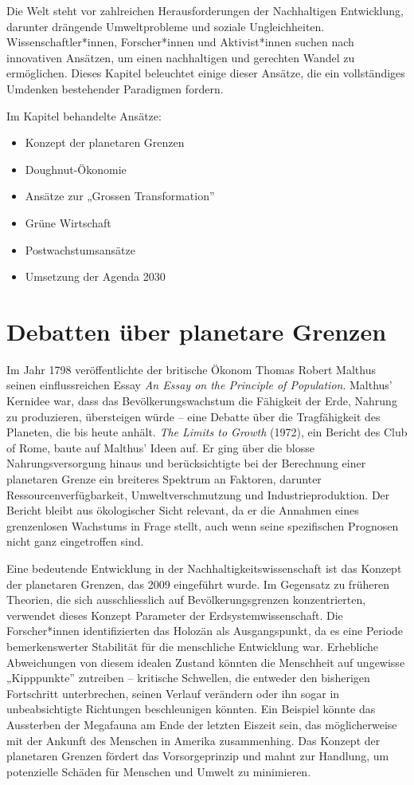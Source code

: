 \documentclass[
  nswissgerman,
  a4paper,
  DIV=11,
  numbers=noendperiod,
  oneside,
  openany]{scrreprt}
\begin{document}
Die Welt steht vor zahlreichen Herausforderungen der Nachhaltigen
Entwicklung, darunter drängende Umweltprobleme und soziale
Ungleichheiten. Wissenschaftler*innen, Forscher*innen und Aktivist*innen
suchen nach innovativen Ansätzen, um einen nachhaltigen und gerechten
Wandel zu ermöglichen. Dieses Kapitel beleuchtet einige dieser Ansätze,
die ein vollständiges Umdenken bestehender Paradigmen fordern.

Im Kapitel behandelte Ansätze:

\begin{itemize}
\item
  Konzept der planetaren Grenzen
\item
  Doughnut-Ökonomie
\item
  Ansätze zur „Grossen Transformation''
\item
  Grüne Wirtschaft
\item
  Postwachstumsansätze
\item
  Umsetzung der Agenda 2030
\end{itemize}

\section{Debatten über planetare
Grenzen}\label{debatten-uxfcber-planetare-grenzen}

Im Jahr 1798 veröffentlichte der britische Ökonom Thomas Robert Malthus
seinen einflussreichen Essay \emph{An Essay on the Principle of
Population}. Malthus' Kernidee war, dass das Bevölkerungswachstum die
Fähigkeit der Erde, Nahrung zu produzieren, übersteigen würde -- eine
Debatte über die Tragfähigkeit des Planeten, die bis heute anhält.
\emph{The Limits to Growth} (1972), ein Bericht des Club of Rome, baute
auf Malthus' Ideen auf. Er ging über die blosse Nahrungsversorgung
hinaus und berücksichtigte bei der Berechnung einer planetaren Grenze
ein breiteres Spektrum an Faktoren, darunter Ressourcenverfügbarkeit,
Umweltverschmutzung und Industrieproduktion. Der Bericht bleibt aus
ökologischer Sicht relevant, da er die Annahmen eines grenzenlosen
Wachstums in Frage stellt, auch wenn seine spezifischen Prognosen nicht
ganz eingetroffen sind.

Eine bedeutende Entwicklung in der Nachhaltigkeitswissenschaft ist das
Konzept der planetaren Grenzen, das 2009 eingeführt wurde. Im Gegensatz
zu früheren Theorien, die sich ausschliesslich auf Bevölkerungsgrenzen
konzentrierten, verwendet dieses Konzept Parameter der
Erdsystemwissenschaft. Die Forscher*innen identifizierten das Holozän
als Ausgangspunkt, da es eine Periode bemerkenswerter Stabilität für die
menschliche Entwicklung war. Erhebliche Abweichungen von diesem idealen
Zustand könnten die Menschheit auf ungewisse „Kipppunkte'' zutreiben --
kritische Schwellen, die entweder den bisherigen Fortschritt
unterbrechen, seinen Verlauf verändern oder ihn sogar in unbeabsichtigte
Richtungen beschleunigen könnten. Ein Beispiel könnte das Aussterben der
Megafauna am Ende der letzten Eiszeit sein, das möglicherweise mit der
Ankunft des Menschen in Amerika zusammenhing. Das Konzept der planetaren
Grenzen fördert das Vorsorgeprinzip und mahnt zur Handlung, um
potenzielle Schäden für Menschen und Umwelt zu minimieren.
\end{document}
